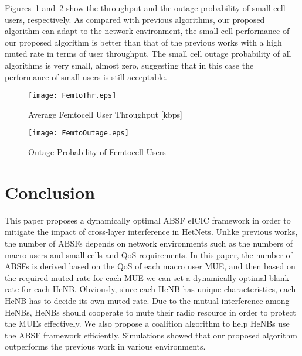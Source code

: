 \documentclass[paper]{ieice}
\begin{document}
Figures~\ref{fig:M-Thr-Femto} and~\ref{fig:M-Outage-Femto} show the throughput and the outage probability of small cell users, respectively. As compared with previous algorithms, our proposed algorithm can adapt to the network environment, the small cell performance of our proposed algorithm is better than that of the previous works with a high muted rate in terms of user throughput. The small cell outage probability of all algorithms is very small, almost zero, suggesting that in this case the performance of small users is still acceptable.
\begin{figure}[t]
        \centering
        \texttt{[image: FemtoThr.eps]}
        \caption{Average Femtocell User Throughput [kbps]}
        \label{fig:M-Thr-Femto}
\end{figure}\begin{figure}[t]
      \centering
      \texttt{[image: FemtoOutage.eps]}
      \caption{Outage Probability of Femtocell Users}
      \label{fig:M-Outage-Femto}
\end{figure}


\section{Conclusion}
\label{Conclusion}
This paper proposes a dynamically optimal ABSF eICIC framework in order to mitigate the impact of cross-layer interference in HetNets. Unlike previous works, the number of ABSFs depends on network environments such as the numbers of macro users and small cells and QoS requirements. In this paper, the number of ABSFs is derived based on the QoS of each macro user MUE, and then based on the required muted rate for each MUE we can set a dynamically optimal blank rate for each HeNB. Obviously, since each HeNB has unique characteristics, each HeNB has to decide its own muted rate. Due to the mutual interference among HeNBs, HeNBs should cooperate to mute their radio resource in order to protect the MUEs effectively. We also propose a coalition algorithm to help HeNBs use the ABSF framework efficiently. Simulations showed that our proposed algorithm outperforms the previous work in various environments.


\end{document}
